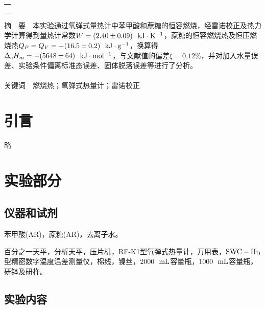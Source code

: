 \documentclass[12pt]{article}
\begin{document}
\begin{titlepage}
\begin{center}
            \begin{tabular*}{\textwidth}{c}
                \\ %
                \\ %
                \\ %
                \\ %
                \hline %
            \end{tabular*}
        \end{center}
        \textsf{摘\ \ 要}\ \ 本实验通过氧弹式量热计中苯甲酸和蔗糖的恒容燃烧，经雷诺校正及热力学计算得到量热计常数$W=(2.40\pm 0.09)\ \ {\rm kJ\cdot K^{-1}}$，蔗糖的恒容燃烧热及恒压燃烧热$Q_{P}=Q_{V}=-(16.5\pm 0.2)\ \ {\rm kJ\cdot g^{-1}}$，换算得$\Delta_{c}H_{m}=-(5648\pm 64)\ \ {\rm kJ\cdot mol^{-1}}$，与文献值的偏差$\xi=0.12\%$，并对加入水量误差、实验条件偏离标准态误差、固体脱落误差等进行了分析。
        \\
        \\
        \textsf{关键词}\ \ 燃烧热；氧弹式热量计；雷诺校正
    \end{titlepage}

    \section{引言}
	略
               
\vbox{}        
    \section{实验部分}
    	\subsection{仪器和试剂}
    	苯甲酸(AR)，蔗糖(AR)，去离子水。\par 
    	百分之一天平，分析天平，压片机，RF-K1型氧弹式热量计，万用表，$\rm SWC-II_{D}$型精密数字温度温差测量仪，棉线，镍丝，$\rm 2000 \ \ {\rm mL}$容量瓶，$\rm 1000 \ \ {\rm mL}$容量瓶，研钵及研杵。
     
\vbox{}
    	 \subsection{实验内容\citealp{physchemlab}}
\end{document}
